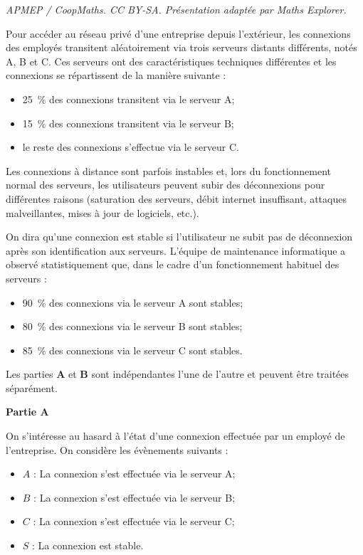\documentclass[10pt]{article}
\begin{document}
\noindent\textit{APMEP / CoopMaths. CC BY-SA. Présentation adaptée par Maths Explorer.}\par\medskip
\medskip
Pour accéder au réseau privé d'une entreprise depuis l'extérieur, les connexions des employés transitent aléatoirement via trois serveurs distants différents, notés A, B et C. Ces serveurs ont des caractéristiques techniques différentes et les connexions se répartissent de la manière suivante :

\begin{itemize}
\item 25~\% des connexions transitent via le serveur A;
\item 15~\% des connexions transitent via le serveur B;
\item le reste des connexions s'effectue via le serveur C.
\end{itemize}

\medskip

Les connexions à distance sont parfois instables et, lors du fonctionnement normal des serveurs, les utilisateurs peuvent subir des déconnexions pour différentes raisons (saturation des serveurs, débit internet insuffisant, attaques malveillantes, mises à jour de logiciels, etc.).

\medskip

On dira qu'une connexion est stable si l'utilisateur ne subit pas de déconnexion après son identification aux serveurs. L'équipe de maintenance informatique a observé statistiquement que, dans le cadre d'un fonctionnement habituel des serveurs :

\begin{itemize}
\item 90~\% des connexions via le serveur A sont stables;
\item 80~\% des connexions via le serveur B sont stables;
\item 85~\% des connexions via le serveur C sont stables.
\end{itemize}

Les parties \textbf{A} et \textbf{B} sont indépendantes l'une de l'autre et peuvent être traitées séparément.

\medskip

\textbf{Partie A}

\medskip

On s'intéresse au hasard à l'état d'une connexion effectuée par un employé de l'entreprise. On considère les évènements suivants :

\begin{itemize}
\item $A$ : \og La connexion s'est effectuée via le serveur A\fg{};
\item $B$ : \og La connexion s'est effectuée via le serveur B\fg{};
\item $C$ : \og La connexion s'est effectuée via le serveur C\fg{};
\item $S$ : \og La connexion est stable\fg.
\end{itemize}
\end{document}
